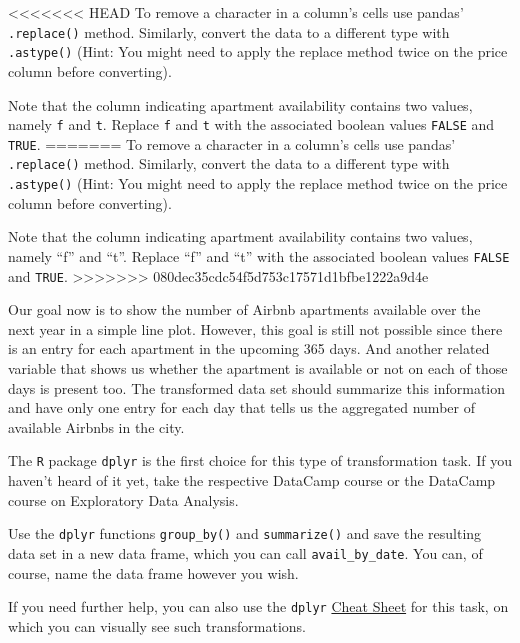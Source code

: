 \documentclass[
  11pt,
]{article}
\newenvironment{tips}[1]
  {
  \begin{itemize}
  \footnotesize
  \renewcommand{\labelitemi}{
    \raisebox{-.7\height}[0pt][0pt]{
      {\setkeys{Gin}{width=3em,keepaspectratio}
        \texttt{[image: images/\#1.png]}}
    }
  }
  \setlength{\fboxsep}{1em}
  \begin{rbox}
  \item
  }
  {
  \end{rbox}
  \end{itemize}
  }
\newenvironment{tipsp}[1]
  {
  \begin{itemize}
  \footnotesize
  \renewcommand{\labelitemi}{
    \raisebox{-.7\height}[0pt][0pt]{
      {\setkeys{Gin}{width=3em,keepaspectratio}
        \texttt{[image: images/\#1.png]}}
    }
  }
  \setlength{\fboxsep}{1em}
  \begin{pbox}
  \item
  }
  {
  \end{pbox}
  \end{itemize}
  }
\begin{document}
\begin{tipsp}p
<<<<<<< HEAD
To remove a character in a column's cells use pandas' \texttt{.replace()} method.
Similarly, convert the data to a different type with \texttt{.astype()} (Hint: You might need to apply the replace method twice on the price column before converting).

Note that the column indicating apartment availability contains two values, namely \texttt{f} and \texttt{t}.
Replace \texttt{f} and \texttt{t} with the associated boolean values \texttt{FALSE} and \texttt{TRUE}.
=======
To remove a character in a column's cells use pandas' \texttt{.replace()} method. Similarly, convert the data to a different type with \texttt{.astype()} (Hint: You might need to apply the replace method twice on the price column before converting).

Note that the column indicating apartment availability contains two values, namely ``f'' and ``t''. Replace ``f'' and ``t'' with the associated boolean values \texttt{FALSE} and \texttt{TRUE}.
>>>>>>> 080dec35cdc54f5d753c17571d1bfbe1222a9d4e

\end{tipsp}

Our goal now is to show the number of Airbnb apartments available over the next year in a simple line plot.
However, this goal is still not possible since there is an entry for each apartment in the upcoming 365 days.
And another related variable that shows us whether the apartment is available or not on each of those days is present too.
The transformed data set should summarize this information and have only one entry for each day that tells us the aggregated number of available Airbnbs in the city.

\begin{tips}r
The \texttt{R} package \texttt{dplyr} is the first choice for this type of transformation task.
If you haven't heard of it yet, take the respective DataCamp course or the DataCamp course on Exploratory Data Analysis.

Use the \texttt{dplyr} functions \texttt{group\_by()} and \texttt{summarize()} and save the resulting data set in a new data frame, which you can call \texttt{avail\_by\_date}.
You can, of course, name the data frame however you wish.

If you need further help, you can also use the \texttt{dplyr} \href{https://www.rstudio.com/wp-content/uploads/2015/02/data-wrangling-cheatsheet.pdf}{Cheat Sheet} for this task, on which you can visually see such transformations.

\end{tips}
\end{document}
